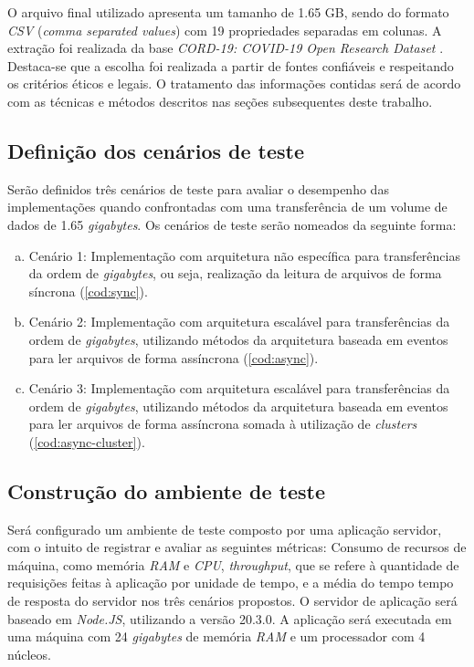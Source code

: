 \documentclass[12pt]{article}
\begin{document}
O arquivo final utilizado apresenta um tamanho de 1.65 GB, sendo do formato \textit{CSV} (\textit{comma separated values}) 
com 19 propriedades separadas em colunas. A extração foi realizada da base 
\textit{CORD-19: COVID-19 Open Research Dataset} \cite{BASE}. Destaca-se que a escolha foi realizada a partir 
de fontes confiáveis e respeitando os critérios éticos e legais. O tratamento das informações contidas será de 
acordo com as técnicas e métodos descritos nas seções subsequentes deste trabalho.


\subsection{Definição dos cenários de teste}


Serão definidos três cenários de teste para avaliar o desempenho das implementações quando confrontadas
com uma transferência de um volume de dados de 1.65 \textit{gigabytes}. Os cenários de teste serão 
nomeados da seguinte forma:

\begin{enumerate}[a)]
\item Cenário 1: Implementação com arquitetura não específica para transferências da ordem de \textit{gigabytes}, 
ou seja, realização da leitura de arquivos de forma síncrona (\autoref{cod:sync}).
\item Cenário 2: Implementação com arquitetura escalável para transferências da ordem de \textit{gigabytes}, 
utilizando métodos da arquitetura baseada em eventos para ler arquivos de forma assíncrona (\autoref{cod:async}).
\item Cenário 3: Implementação com arquitetura escalável para transferências da ordem de \textit{gigabytes}, 
utilizando métodos da arquitetura baseada em eventos para ler arquivos de forma assíncrona somada à utilização de
\textit{clusters} (\autoref{cod:async-cluster}).
\end{enumerate}


\subsection{Construção do ambiente de teste}

Será configurado um ambiente de teste composto por uma aplicação servidor, com o intuito de registrar e avaliar as seguintes métricas:
Consumo de recursos de máquina, como memória \textit{RAM} e \textit{CPU}, \textit{throughput}, que se refere à quantidade de requisições feitas à aplicação por unidade de tempo,
e a média do tempo tempo de resposta do servidor nos três cenários propostos. 
O servidor de aplicação será baseado em \textit{Node.JS}, utilizando a versão 20.3.0. A aplicação será executada em uma máquina
com 24 \textit{gigabytes} de memória \textit{RAM} e um processador com 4 núcleos.
\end{document}

